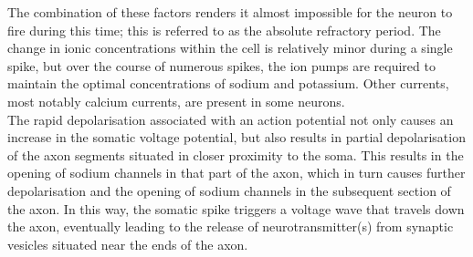 \noindent The combination of these factors renders it almost impossible for the neuron to fire during this time; this is referred to as the absolute refractory period. The change in ionic concentrations within the cell is relatively minor during a single spike, but over the course of numerous spikes, the ion pumps are required to maintain the optimal concentrations of sodium and potassium. Other currents, most notably calcium currents, are present in some neurons. \\

\noindent The rapid depolarisation associated with an action potential not only causes an increase in the somatic voltage potential, but also results in partial depolarisation of the axon segments situated in closer proximity to the soma. This results in the opening of sodium channels in that part of the axon, which in turn causes further depolarisation and the opening of sodium channels in the subsequent section of the axon. In this way, the somatic spike triggers a voltage wave that travels down the axon, eventually leading to the release of neurotransmitter(s) from synaptic vesicles situated near the ends of the axon. \\




